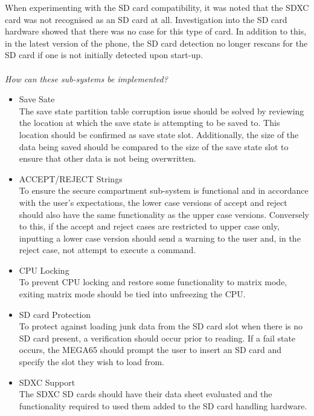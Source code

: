 When experimenting with the SD card compatibility, it was noted that the SDXC card was not recognised as an SD card at all. Investigation into the SD card hardware showed that there was no case for this type of card. 
In addition to this, in the latest version of the phone, the SD card detection no longer rescans for the SD card if one is not initially detected upon start-up.\\
\\
\textit{How can these sub-systems be implemented?}\\
\begin{itemize}
\item{Save Sate}\\
  The save state partition table corruption issue should be solved by reviewing the location at which the save state is attempting to be saved to. 
  This location should be confirmed as save state slot. 
  Additionally, the size of the data being saved should be compared to the size of the save state slot to ensure that other data is not being overwritten.
\item{ACCEPT/REJECT Strings}\\
  To ensure the secure compartment sub-system is functional and in accordance with the user's expectations, the lower case versions of accept and reject should also have the same functionality as the upper case versions. 
  Conversely to this, if the accept and reject cases are restricted to upper case only, inputting a lower case version should send a warning to the user and, in the reject case, not attempt to execute a command.
\item{CPU Locking}\\
  To prevent CPU locking and restore some functionality to matrix mode, exiting matrix mode should be tied into unfreezing the CPU.
\item{SD card Protection}\\
 To protect against loading junk data from the SD card slot when there is no SD card present, a verification should occur prior to reading. If a fail state occurs, the MEGA65 should prompt the user to insert an SD card and specify the slot they wish to load from.
\item{SDXC Support}\\
  The SDXC SD cards should have their data sheet evaluated and the functionality required to used them added to the SD card handling hardware.
\end{itemize}

